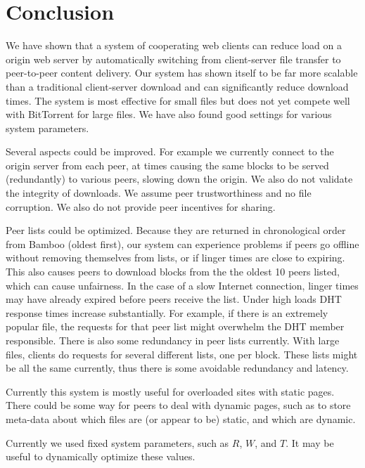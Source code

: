 \section{Conclusion}

We have shown that a system of cooperating web clients can reduce load on a origin web server by automatically switching
from client-server file transfer to peer-to-peer content delivery. Our system has shown itself to be far more scalable 
than a traditional client-server download and can significantly
reduce download times.  The system is most effective for small files but does not yet compete well with
BitTorrent for large files.  We have also found good settings for various system parameters.

Several aspects could be improved.  For example we currently connect to the origin
server from each peer, at times causing the same blocks to be served (redundantly) to various peers, slowing down the origin.
We also do not validate the integrity of downloads.  We assume peer trustworthiness and no file corruption.  We also do not provide peer incentives for sharing.

Peer lists could be optimized.  Because they are returned in chronological order from Bamboo (oldest first), our system can experience problems if peers
go offline without removing themselves from lists, or if linger times are close to expiring.  This also causes peers to download blocks 
from the the oldest 10 peers listed, which can cause unfairness. In the case of a slow Internet connection, linger times may have
already expired before peers receive the list.
Under high loads DHT response times increase substantially.  For example, if there is an extremely popular file, the 
requests for that peer list might overwhelm the DHT member responsible.  There is also some redundancy in peer lists currently.  
With large files, clients do requests for several different lists, one per block.  These lists might be all the same currently, thus
there is some avoidable redundancy and latency.

Currently this system is mostly useful for overloaded sites with static pages.  There could be some way for peers to deal with dynamic pages, such as to
store meta-data about which files are (or appear to be) static, and which are dynamic.  

Currently we used fixed system parameters, such as $R$, $W$, and $T$.  It may be useful to dynamically optimize these values.